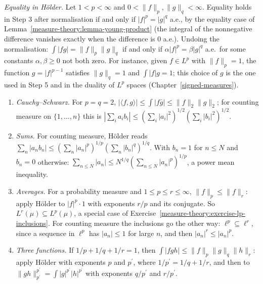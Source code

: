 \begin{remark}\label{measure-theory:remark-holder-equality}
\emph{Equality in H\"older.} Let $1 < p < \infty$ and $0 < \|f\|_p, \|g\|_q < \infty$. Equality holds in Step 3 after normalisation if and only if $|f|^p = |g|^q$ a.e., by the equality case of
Lemma~\ref{measure-theory:lemma-young-product} (the integral of the nonnegative difference vanishes exactly when the difference is $0$ a.e.). Undoing the normalisation: $\int|fg| = \|f\|_p\|g\|_q$ if
and only if $\alpha|f|^p = \beta|g|^q$ a.e.\ for some constants $\alpha, \beta \geq 0$ not both zero. For instance, given $f \in L^p$ with $\|f\|_p = 1$, the function $g = |f|^{p-1}$ satisfies
$\|g\|_q = 1$ and $\int|f|g = 1$; this choice of $g$ is the one used in Step 5 and in the duality of $L^p$ spaces (Chapter~\ref{signed-measures}).
\end{remark}

\begin{example}\label{measure-theory:example-holder}
\begin{enumerate}
\item \emph{Cauchy--Schwarz.} For $p = q = 2$, $|\langle f, g \rangle| \leq \int|f\bar g| \leq \|f\|_2\|g\|_2$; for counting measure on $\{1, \ldots, n\}$ this is
$|\sum_ia_ib_i| \leq (\sum_i|a_i|^2)^{1/2}(\sum_i|b_i|^2)^{1/2}$.
\item \emph{Sums.} For counting measure, H\"older reads $\sum_n|a_nb_n| \leq (\sum_n|a_n|^p)^{1/p}(\sum_n|b_n|^q)^{1/q}$. With $b_n = 1$ for $n \leq N$ and $b_n = 0$ otherwise: $\sum_{n \leq N}|a_n| \leq N^{1/q}(\sum_{n \leq N}|a_n|^p)^{1/p}$, a
power mean inequality.
\item \emph{Averages.} For a probability measure and $1 \leq p \leq r \leq \infty$, $\|f\|_p \leq \|f\|_r$: apply H\"older to $|f|^p \cdot 1$ with exponents $r/p$ and its conjugate. So
$L^r(\mu) \subseteq L^p(\mu)$, a special case of Exercise~\ref{measure-theory:exercise-lp-inclusions}. For counting measure the inclusions go the other way: $\ell^p \subseteq \ell^r$, since a sequence in $\ell^p$
has $|a_n| \leq 1$ for large $n$, and then $|a_n|^r \leq |a_n|^p$.
\item \emph{Three functions.} If $1/p + 1/q + 1/r = 1$, then $\int|fgh| \leq \|f\|_p\|g\|_q\|h\|_r$: apply H\"older with exponents $p$ and $p^{\prime}$, where $1/p^{\prime} = 1/q + 1/r$, and then to
$\|gh\|_{p^{\prime}}^{p^{\prime}} = \int|g|^{p^{\prime}}|h|^{p^{\prime}}$ with exponents $q/p^{\prime}$ and $r/p^{\prime}$.
\end{enumerate}
\end{example}

